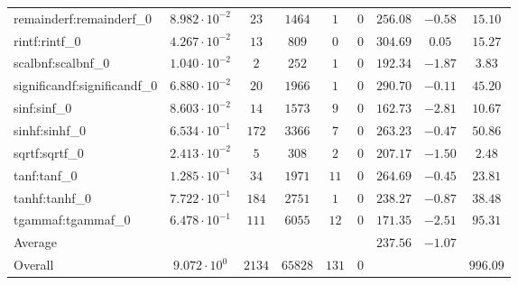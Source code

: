 \begin{tabular}{|l|c|c|c|c|c|c|c|c|}
remainderf:remainderf\_0     & $ 8.982 \cdot 10^{-2} $ & $ 23     $ & $ 1464  $ & $ 1   $ & $ 0   $ & $ 256.08      $ & $ -0.58   $ & $ 15.10   $ \\
rintf:rintf\_0               & $ 4.267 \cdot 10^{-2} $ & $ 13     $ & $ 809   $ & $ 0   $ & $ 0   $ & $ 304.69      $ & $ 0.05    $ & $ 15.27   $ \\
scalbnf:scalbnf\_0           & $ 1.040 \cdot 10^{-2} $ & $ 2      $ & $ 252   $ & $ 1   $ & $ 0   $ & $ 192.34      $ & $ -1.87   $ & $ 3.83    $ \\
significandf:significandf\_0 & $ 6.880 \cdot 10^{-2} $ & $ 20     $ & $ 1966  $ & $ 1   $ & $ 0   $ & $ 290.70      $ & $ -0.11   $ & $ 45.20   $ \\
sinf:sinf\_0                 & $ 8.603 \cdot 10^{-2} $ & $ 14     $ & $ 1573  $ & $ 9   $ & $ 0   $ & $ 162.73      $ & $ -2.81   $ & $ 10.67   $ \\
sinhf:sinhf\_0               & $ 6.534 \cdot 10^{-1} $ & $ 172    $ & $ 3366  $ & $ 7   $ & $ 0   $ & $ 263.23      $ & $ -0.47   $ & $ 50.86   $ \\
sqrtf:sqrtf\_0               & $ 2.413 \cdot 10^{-2} $ & $ 5      $ & $ 308   $ & $ 2   $ & $ 0   $ & $ 207.17      $ & $ -1.50   $ & $ 2.48    $ \\
tanf:tanf\_0                 & $ 1.285 \cdot 10^{-1} $ & $ 34     $ & $ 1971  $ & $ 11  $ & $ 0   $ & $ 264.69      $ & $ -0.45   $ & $ 23.81   $ \\
tanhf:tanhf\_0               & $ 7.722 \cdot 10^{-1} $ & $ 184    $ & $ 2751  $ & $ 1   $ & $ 0   $ & $ 238.27      $ & $ -0.87   $ & $ 38.48   $ \\
tgammaf:tgammaf\_0           & $ 6.478 \cdot 10^{-1} $ & $ 111    $ & $ 6055  $ & $ 12  $ & $ 0   $ & $ 171.35      $ & $ -2.51   $ & $ 95.31   $ \\
\hline
Average                      & $                     $ & $        $ & $       $ & $     $ & $     $ & $ 237.56      $ & $ -1.07   $ & $         $ \\
\hline
Overall                      & $ 9.072 \cdot 10^{0}  $ & $ 2134   $ & $ 65828 $ & $ 131 $ & $ 0   $ & $             $ & $         $ & $ 996.09  $ \\
\hline
\end{tabular}
